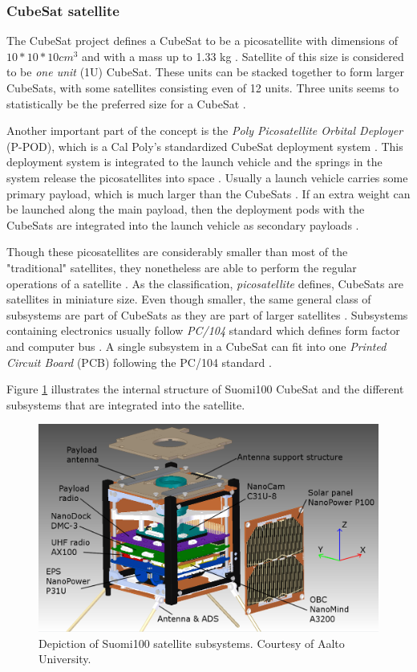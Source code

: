 \documentclass[english,12pt,a4paper,pdftex,elec,utf8]{aaltothesis}
\begin{document}
\subsubsection{CubeSat satellite}
The CubeSat project defines a CubeSat to be a picosatellite with dimensions of ${10 * 10 * 10 cm^3}$ and with a mass up to 1.33 kg \cite{cds}. Satellite of this size is considered to be \textit{one unit} (1U) CubeSat. These units can be stacked together to form larger CubeSats, with some satellites consisting even of 12 units. Three units seems to statistically be the preferred size for a CubeSat \cite{Swart2016}. \par
Another important part of the concept is the \textit{Poly Picosatellite Orbital Deployer} (P-POD), which is a Cal Poly’s standardized CubeSat deployment system \cite{cds}. This deployment system is integrated to the launch vehicle and the springs in the system release the picosatellites into space \cite{cds}. Usually a launch vehicle carries some primary payload, which is much larger than the CubeSats \cite{nasacubesat1}. If an extra weight can be launched along the main payload, then the deployment pods with the CubeSats are integrated into the launch vehicle as secondary payloads \cite{nasacubesat1}. \par 
Though these picosatellites are considerably smaller than most of the "traditional" satellites, they nonetheless are able to perform the regular operations of a satellite \cite{openorbiter}. As the classification, \textit{picosatellite} defines, CubeSats are satellites in miniature size. Even though smaller, the same general class of subsystems are part of CubeSats as they are part of larger satellites \cite{openorbiter}. Subsystems containing electronics usually follow \textit{PC/104} standard which defines form factor and computer bus \cite{reliabilitycubesatelbus}. A single subsystem in a CubeSat can fit into one \textit{Printed Circuit Board} (PCB) following the PC/104 standard \cite{reliabilitycubesatelbus}.\par
Figure \ref{s100cad} illustrates the internal structure of Suomi100 CubeSat and the different subsystems that are integrated into the satellite.\par 
\begin{figure}[!h]
\centering
\includegraphics[scale=0.2]{s100cad}
\caption{Depiction of Suomi100 satellite subsystems. Courtesy of Aalto University. \cite{s100blogi}}
\label{s100cad}
\end{figure}  
\end{document}
